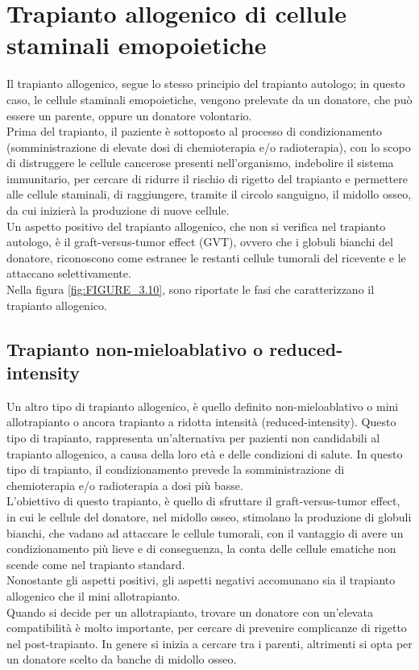 \section{Trapianto allogenico di cellule staminali emopoietiche}

Il trapianto allogenico, segue lo stesso principio del trapianto autologo; in questo caso, le cellule staminali emopoietiche, 
vengono prelevate da un donatore, che può essere un parente, oppure un donatore volontario.\\ 
Prima del trapianto, il paziente è sottoposto al processo di condizionamento (somministrazione di elevate dosi di 
chemioterapia e/o radioterapia), con lo scopo di distruggere le cellule cancerose presenti nell’organismo, 
indebolire il sistema immunitario, per cercare di ridurre il rischio di rigetto del trapianto e permettere alle 
cellule staminali, di raggiungere, tramite il circolo sanguigno, il midollo osseo, da cui inizierà la produzione 
di nuove cellule.\\
Un aspetto positivo del trapianto allogenico, che non si verifica nel trapianto autologo, è il graft-versus-tumor 
effect (GVT), ovvero che i globuli bianchi del donatore, riconoscono come estranee le restanti cellule tumorali 
del ricevente e le attaccano selettivamente\cite{LLSBLOOD}.\\ Nella figura \ref{fig:FIGURE_3.10}, 
sono riportate le fasi che caratterizzano il trapianto allogenico.

\subsection{Trapianto non-mieloablativo o reduced-intensity}

Un altro tipo di trapianto allogenico, è quello definito non-mieloablativo o mini allotrapianto o ancora trapianto a 
ridotta intensità (reduced-intensity). Questo tipo di trapianto, rappresenta un’alternativa per pazienti non 
candidabili al trapianto allogenico, a causa della loro età e delle condizioni di salute. In questo tipo di trapianto, 
il condizionamento prevede la somministrazione di chemioterapia e/o radioterapia a dosi più basse\cite{LLSBLOOD}.\\
L’obiettivo di questo trapianto, è quello di sfruttare il graft-versus-tumor effect, in cui le cellule del donatore, 
nel midollo osseo, stimolano la produzione di globuli bianchi, che vadano ad attaccare le cellule tumorali, con il 
vantaggio di avere un condizionamento più lieve e di conseguenza, la conta delle cellule ematiche 
non scende come nel trapianto standard\cite{STEMCELLS}.\\
Nonostante gli aspetti positivi, gli aspetti negativi accomunano sia il trapianto allogenico che il mini allotrapianto.\\
Quando si decide per un allotrapianto, trovare un donatore con un’elevata compatibilità è molto importante, 
per cercare di prevenire complicanze di rigetto nel post-trapianto. In genere si inizia a cercare tra i parenti, 
altrimenti si opta per un donatore scelto da banche di midollo osseo\cite{TRAPIANTO}.

